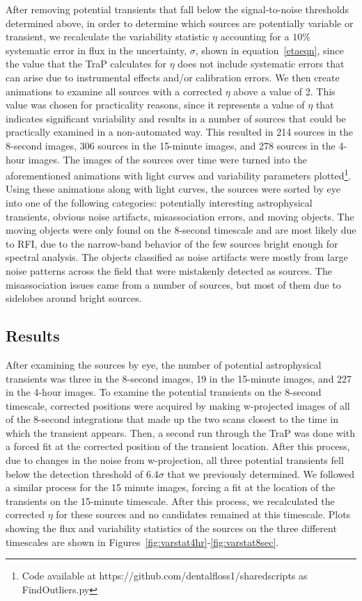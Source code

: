 \documentclass[12pt]{article}
\begin{document}
After removing potential transients that fall below the signal-to-noise thresholds determined above, in order to determine which sources are potentially variable or transient, we recalculate the variability statistic $\eta$ accounting for a $10\%$ systematic error in flux in the uncertainty, $\sigma$, shown in equation~\ref{etaeqn}, since the value that the TraP calculates for $\eta$ does not include systematic errors that can arise due to instrumental effects and/or calibration errors. We then create animations to examine all sources with a corrected $\eta$ above a value of 2. This value was chosen for practicality reasons, since it represents a value of $\eta$ that indicates significant variability and results in a number of sources that could be practically examined in a non-automated way. This resulted in 214 sources in the 8-second images, 306 sources in the 15-minute images, and 278 sources in the 4-hour images. The images of the sources over time were turned into the aforementioned animations with light curves and variability parameters plotted\footnote{Code available at https://github.com/dentalfloss1/sharedscripts as FindOutliers.py}. Using these animations along with light curves, the sources were sorted by eye into one of the following categories: potentially interesting astrophysical transients, obvious noise artifacts, misassociation errors, and moving objects. The moving objects were only found on the 8-second timescale and are most likely due to RFI, due to the narrow-band behavior of the few sources bright enough for spectral analysis. The objects classified as noise artifacts were mostly from large noise patterns across the field that were mistakenly detected as sources. The misassociation issues came from a number of sources, but most of them due to sidelobes around bright sources. 


\subsection{Results}
\label{sec:results2}
After examining the sources by eye, the number of potential astrophysical transients was three in the 8-second images, 19 in the 15-minute images, and 227 in the 4-hour images. To examine the potential transients on the 8-second timescale, corrected positions were acquired by making w-projected images of all of the 8-second integrations that made up the two scans closest to the time in which the transient appears. Then, a second run through the TraP was done with a forced fit at the corrected position of the transient location. After this process, due to changes in the noise from w-projection, all three potential transients fell below the detection threshold of 6.4$\sigma$ that we previously determined. We followed a similar process for the 15 minute images, forcing a fit at the location of the transients on the 15-minute timescale. After this process, we recalculated the corrected $\eta$ for these sources and no candidates remained at this timescale. Plots showing the flux and variability statistics of the sources on the three different timescales are shown in Figures~\ref{fig:varstat4hr}-\ref{fig:varstat8sec}.
\end{document}
